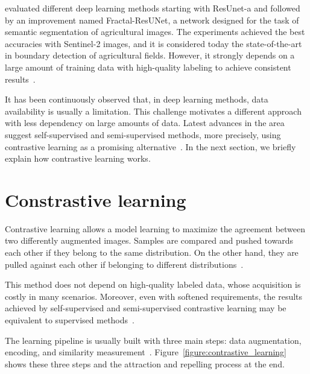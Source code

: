 \documentclass[12pt]{article}
\begin{document}
\citet{waldner2020} evaluated different deep learning methods starting with \mbox{ResUnet-a} and followed by an improvement named Fractal-ResUNet, a network designed for the task of semantic segmentation of agricultural images. The experiments achieved the best accuracies with Sentinel-2 images, and it is considered today the state-of-the-art in boundary detection of agricultural fields. However, it strongly depends on a large amount of training data with high-quality labeling to achieve consistent results~\cite{waldner2020,waldner2021}.

It has been continuously observed that, in deep learning methods, data availability is usually a limitation. This challenge motivates a different approach with less dependency on large amounts of data. Latest advances in the area suggest self-supervised and semi-supervised methods, more precisely, using contrastive learning as a promising alternative~\cite{guldenring2021}. %
In the next section, we briefly explain how contrastive learning works.

\section{Constrastive learning}\label{section:constrastive-learning}

Contrastive learning allows a model learning to maximize the agreement between two differently augmented images. Samples are compared and pushed towards each other if they belong to the same distribution. On the other hand, they are pulled against each other if belonging to different distributions~\cite{chen2020}.

This method does not depend on high-quality labeled data, whose acquisition is costly in many scenarios. Moreover, even with softened requirements, the results achieved by self-supervised and semi-supervised contrastive learning may be equivalent to supervised methods~\citep{chen2020}.

The learning pipeline is usually built with three main steps: data augmentation, encoding, and similarity measurement~\citep{ashish2020}. Figure~\ref{figure:contrastive_learning} shows these three steps and the attraction and repelling process at the end.
\end{document}

